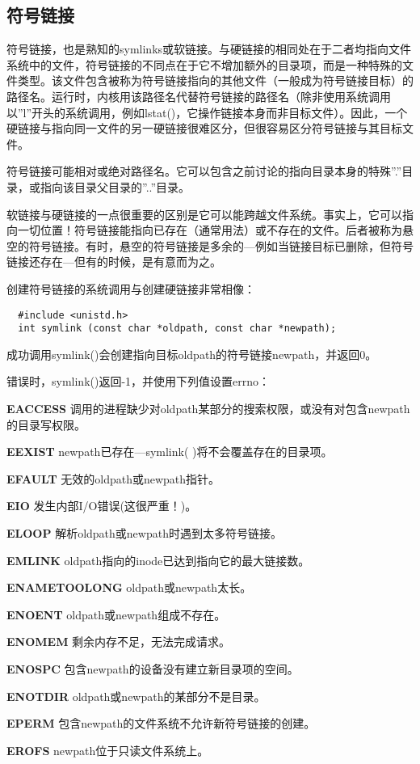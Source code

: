 \subsection{符号链接}

符号链接，也是熟知的symlinks或软链接。与硬链接的相同处在于二者均指向文件系统中的文件，符号链接的不同点在于它不增加额外的目录项，而是一种特殊的文件类型。该文件包含被称为符号链接指向的其他文件（一般成为符号链接目标）的路径名。运行时，内核用该路径名代替符号链接的路径名（除非使用系统调用以''l''开头的系统调用，例如lstat()，它操作链接本身而非目标文件）。因此，一个硬链接与指向同一文件的另一硬链接很难区分，但很容易区分符号链接与其目标文件。

符号链接可能相对或绝对路径名。它可以包含之前讨论的指向目录本身的特殊''.''目录，或指向该目录父目录的''..''目录。

软链接与硬链接的一点很重要的区别是它可以能跨越文件系统。事实上，它可以指向一切位置！符号链接能指向已存在（通常用法）或不存在的文件。后者被称为悬空的符号链接。有时，悬空的符号链接是多余的—例如当链接目标已删除，但符号链接还存在—但有的时候，是有意而为之。

创建符号链接的系统调用与创建硬链接非常相像：

\begin{lstlisting}
  #include <unistd.h>
  int symlink (const char *oldpath, const char *newpath);
\end{lstlisting}

成功调用symlink()会创建指向目标oldpath的符号链接newpath，并返回0。

错误时，symlink()返回-1，并使用下列值设置errno：

\begin{eqlist*}
\item[\textbf{EACCESS}] 调用的进程缺少对oldpath某部分的搜索权限，或没有对包含newpath的目录写权限。
\item[\textbf{EEXIST}] newpath已存在—symlink( )将不会覆盖存在的目录项。
\item[\textbf{EFAULT}] 无效的oldpath或newpath指针。
\item[\textbf{EIO}] 发生内部I/O错误(这很严重！)。
\item[\textbf{ELOOP}] 解析oldpath或newpath时遇到太多符号链接。
\item[\textbf{EMLINK}] oldpath指向的inode已达到指向它的最大链接数。
\item[\textbf{ENAMETOOLONG}] oldpath或newpath太长。
\item[\textbf{ENOENT}] oldpath或newpath组成不存在。
\item[\textbf{ENOMEM}] 剩余内存不足，无法完成请求。
\item[\textbf{ENOSPC}] 包含newpath的设备没有建立新目录项的空间。
\item[\textbf{ENOTDIR}] oldpath或newpath的某部分不是目录。
\item[\textbf{EPERM}] 包含newpath的文件系统不允许新符号链接的创建。
\item[\textbf{EROFS}] newpath位于只读文件系统上。
\end{eqlist*}

